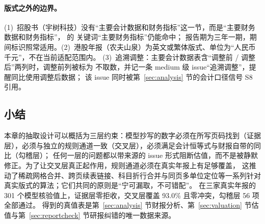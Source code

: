 \paragraph{版式之外的边界。}
(1)~招股书（宇树科技）没有“主要会计数据和财务指标”这一节，而是“主要财务数据和财务指标”， 的  关键词“主要财务指标”仍能命中；
报告期为三年一期，期间标识照常适用。(2)~港股年报（农夫山泉）为英文或繁体版式、单位为“人民币千元”，不在当前适配范围内。
(3)~追溯调整：主要会计数据表含“调整前 / 调整后”两列时，调整前列被标为  不取数，并记一条 medium 级 issue“追溯调整”，提醒同比使用调整后数据；
该 issue 同时被第~\ref{sec:analysis} 节的会计口径信号 S8 引用。

\subsection{小结}
\label{sec:ext-summary}

本章的抽取设计可以概括为三层约束：模型抄写的数字必须在所写页码找到（证据层），必须与独立的规则通道一致（交叉层），必须满足会计恒等式与财报自带的同比（勾稽层）；
任何一层的问题都以带来源的 issue 形式阻断估值，而不是被静默修正。为了让交叉层真正起作用，规则通道必须在真实年报上有足够覆盖，
这推动了稀疏网格合并、跨页续表链接、科目折行合并与同页多单位定位等一系列针对真实版式的算法；它们共同的原则是“宁可漏取，不可错配”。
在三家真实年报的 301 个模型核验值上，证据层零拒收，交叉层覆盖 93.0\% 且零冲突，勾稽层 56 项全部通过。
得到的真值表是第~\ref{sec:analysis} 节财报分析、第~\ref{sec:valuation} 节估值与第~\ref{sec:reportcheck} 节研报纠错的唯一数据来源。
